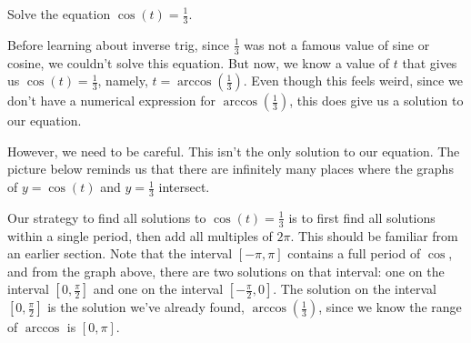 \documentclass{ximera}
\begin{document}
\begin{example}
Solve the equation $\cos(t) = \frac{1}{3}$. 
\begin{explanation}
Before learning about inverse trig, since $\frac{1}{3}$ was not a famous value of sine or cosine, we couldn't solve this equation. But now, we know a value of $t$ that gives us $\cos(t) = \frac{1}{3}$, namely, $t = \arccos\left(\frac{1}{3}\right)$. Even though this feels weird, since we don't have a numerical expression for $\arccos\left(\frac{1}{3}\right)$, this does give us a solution to our equation. 

However, we need to be careful. This isn't the only solution to our equation. The picture below reminds us that there are infinitely many places where the graphs of $y = \cos(t)$ and $y = \frac{1}{3}$ intersect. 
\begin{image}
\end{image}

Our strategy to find all solutions to $\cos(t) = \frac{1}{3}$ is to first find all solutions within a single period, then add all multiples of $2\pi$. This should be familiar from an earlier section. Note that the interval $[-\pi, \pi]$ contains a full period of $\cos$, and from the graph above, there are two solutions on that interval: one on the interval $\left[0, \frac{\pi}{2}\right]$ and one on the interval $\left[-\frac{\pi}{2}, 0\right]$. The solution on the interval $\left[0, \frac{\pi}{2}\right]$ is the solution we've already found, $\arccos\left(\frac{1}{3}\right)$, since we know the range of $\arccos$ is $[0, \pi]$. 


\end{explanation}
\end{example}
\end{document}
